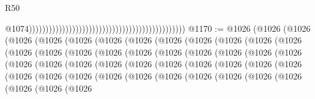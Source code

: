 \begin{lexlean}{R50}
\begin{coremodule}
                                                                                                  @1074)))))))))))))))))))))))))))))))))))))))))))))))
@1170 := @1026
    (@1026
      (@1026
        (@1026
          (@1026
            (@1026
              (@1026
                (@1026
                  (@1026
                    (@1026
                      (@1026
                        (@1026
                          (@1026
                            (@1026
                              (@1026
                                (@1026
                                  (@1026
                                    (@1026
                                      (@1026
                                        (@1026
                                          (@1026
                                            (@1026
                                              (@1026
                                                (@1026
                                                  (@1026
                                                    (@1026
                                                      (@1026
                                                        (@1026
                                                          (@1026
                                                            (@1026
                                                              (@1026
                                                                (@1026
                                                                  (@1026
                                                                    (@1026
                                                                      (@1026
                                                                        (@1026
                                                                          (@1026
                                                                            (@1026
                                                                              (@1026
                                                                                (@1026
                                                                                  (@1026
                                                                                    (@1026
                                                                                      (@1026
                                                                                        (@1026
                                                                                          (@1026
                                                                                            (@1026

\end{coremodule}
\end{lexlean}
